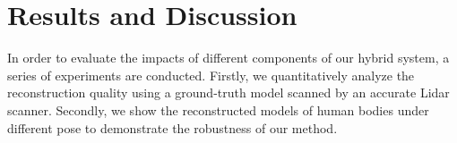 
\section{Results and Discussion}
\label{sec:Results}

In order to evaluate the impacts of different components of our hybrid system, a series of experiments are conducted. Firstly, we quantitatively analyze the reconstruction quality using a ground-truth model scanned by an accurate Lidar scanner.
Secondly, we show the reconstructed models of human bodies under different pose to demonstrate the robustness of our method.




